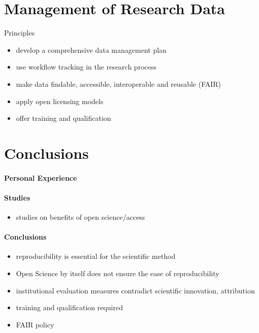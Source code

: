 \documentclass[a4paper, 10pt, twocolumn]{article}
\begin{document}
\section*{Management of Research Data} \label{sec:data_management}

Principles \cite{DFG_GWP:Book,HRK_FDM:WWW,Stodden2014:JORS,H2020_FAIR:ERC}
\begin{itemize}
\item develop a comprehensive data management plan
\item use workflow tracking in the research process
\item make data findable, accessible, interoperable and reusable (FAIR)
\item apply open licensing models
\item offer training and qualification
\end{itemize}


\section*{Conclusions} \label{sec:conclusions} 

\paragraph*{Personal Experience}

\paragraph*{Studies}

\begin{itemize}
\item studies on benefits of open science/access
\end{itemize}

\paragraph*{Conclusions}

\begin{itemize}
\item reproducibility is essential for the scientific method
\item Open Science by itself does not ensure the ease of reproducibility
\item institutional evaluation measures contradict scientific innovation, attribution
\item training and qualification required
\item FAIR policy
\end{itemize}


{


}
\end{document}

